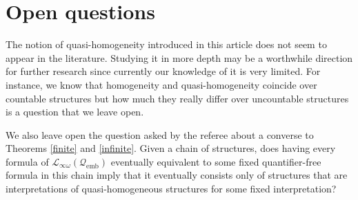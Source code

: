 \documentclass{ndjflart}
\theoremstyle{plain}
\theoremstyle{definition}
\numberwithin{equation}{section}
\DeclareMathOperator{\emb}{emb}
\begin{document}
\section{Open questions}
The notion of quasi-homogeneity introduced in this article does not seem to
appear in the literature.
Studying it in more depth may be a worthwhile direction for further
research since currently our knowledge of it is very limited.
For instance, we know that homogeneity and quasi-homogeneity coincide over
countable structures
but how much they really differ over uncountable structures is a question
that we leave open.

We also leave open the question asked by the referee about a
converse to Theorems \ref{finite} and \ref{infinite}.
Given a chain of structures, does having every formula of
$\mathcal{L}_{\infty \omega}(\mathcal{Q}_{\emb})$
eventually equivalent to some fixed quantifier-free formula in this chain
imply that it eventually consists only of structures that are interpretations
of quasi-homogeneous structures for some fixed interpretation?



\end{document}
